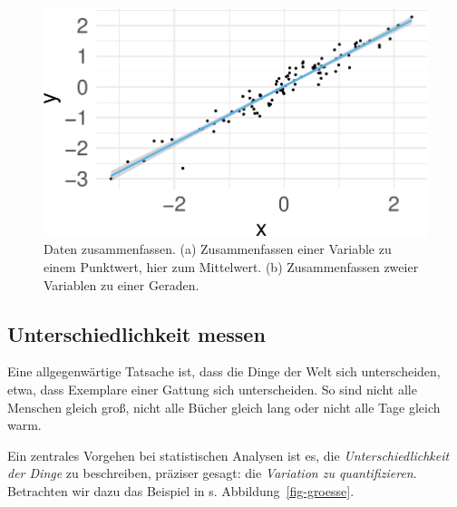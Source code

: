 \documentclass[
  letterpaper,
]{scrbook}
\theoremstyle{definition}
\theoremstyle{definition}
\theoremstyle{definition}
\theoremstyle{remark}
\begin{document}
\begin{figure}
\begin{minipage}{0.45\linewidth}
{\includegraphics[width=1\linewidth,height=\textheight,keepaspectratio]{010-rahmen_files/figure-pdf/fig-zsmnfassen-2.pdf}

}


\end{minipage}%

\caption{\label{fig-zsmnfassen}Daten zusammenfassen. (a) Zusammenfassen
einer Variable zu einem Punktwert, hier zum Mittelwert. (b)
Zusammenfassen zweier Variablen zu einer Geraden.}

\end{figure}%

\subsection{Unterschiedlichkeit
messen}\label{unterschiedlichkeit-messen}

Eine allgegenwärtige Tatsache ist, dass die Dinge der Welt sich
unterscheiden, etwa, dass Exemplare einer Gattung sich unterscheiden. So
sind nicht alle Menschen gleich groß, nicht alle Bücher gleich lang oder
nicht alle Tage gleich warm.

Ein zentrales Vorgehen bei statistischen Analysen ist es, die
\emph{Unterschiedlichkeit der Dinge} zu beschreiben, präziser gesagt:
die \emph{Variation zu quantifizieren}. Betrachten wir dazu das Beispiel
in s. Abbildung~\ref{fig-groesse}.
\end{document}
